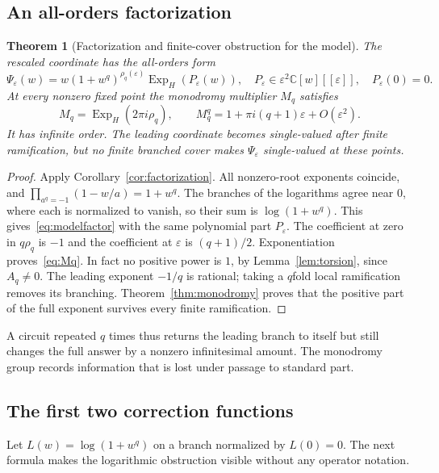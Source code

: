 \documentclass[11pt,a4paper]{article}
\numberwithin{equation}{section}
\newtheorem{theorem}{Theorem}[section]
\theoremstyle{definition}
\theoremstyle{remark}
\newcommand{\C}{\mathbb C}
\newcommand{\eps}{\varepsilon}
\newcommand{\ExpH}{\operatorname{Exp}_{\!H}}
\begin{document}
\subsection{An all-orders factorization}

\begin{theorem}[Factorization and finite-cover obstruction for the model]
\label{thm:modelfactor}
The rescaled coordinate has the all-orders form
\begin{equation}\label{eq:modelfactor}
 \Psi_\eps(w)=w(1+w^q)^{\rho_q(\eps)}\ExpH(P_\eps(w)),
 \quad P_\eps\in\eps^2\C[w][[\eps]],\quad P_\eps(0)=0.
\end{equation}
At every nonzero fixed point the monodromy multiplier $M_q$ satisfies
\begin{equation}\label{eq:Mq}
 M_q=\ExpH(2\pi i\rho_q),\qquad
 M_q^q=1+\pi i(q+1)\eps+O(\eps^2).
\end{equation}
It has infinite order.  The leading coordinate becomes single-valued after
finite ramification, but no finite branched cover makes $\Psi_\eps$
single-valued at these points.
\end{theorem}

\begin{proof}
Apply Corollary~\ref{cor:factorization}.  All nonzero-root exponents coincide,
and
$\prod_{a^q=-1}(1-w/a)=1+w^q$.  The branches of the logarithms agree near
$0$, where each is normalized to vanish, so their sum is
$\log(1+w^q)$.  This gives~\eqref{eq:modelfactor} with the same polynomial
part $P_\eps$.
The coefficient at zero in $q\rho_q$ is $-1$ and the coefficient at $\eps$
is $(q+1)/2$.  Exponentiation proves~\eqref{eq:Mq}.
In fact no positive power is $1$, by Lemma~\ref{lem:torsion}, since
$A_q\ne0$.  The leading exponent $-1/q$ is rational; taking a $q$fold local
ramification removes its branching.  Theorem~\ref{thm:monodromy} proves
that the positive part of the full exponent survives every finite
ramification.
\end{proof}

A circuit repeated $q$ times thus returns the leading branch to itself but
still changes the full answer by a nonzero infinitesimal amount.  The
monodromy group records information that is lost under passage to standard
part.

\subsection{The first two correction functions}

Let $L(w)=\log(1+w^q)$ on a branch normalized by $L(0)=0$.
The next formula makes the logarithmic obstruction visible without any
operator notation.
\end{document}

